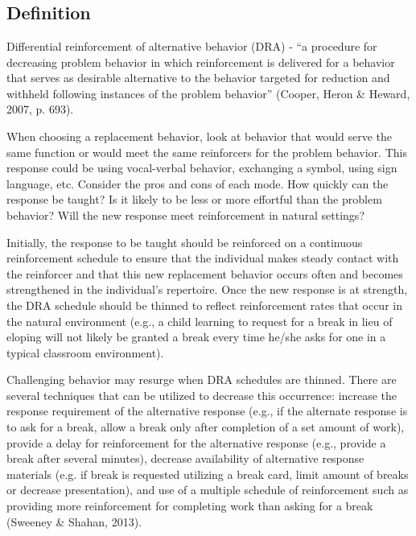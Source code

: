 \clearpage \section[\fourjTen{}]{\fourjTen{}%
              }
\subsection{Definition}
Differential reinforcement of alternative behavior (DRA) -  ``a procedure for decreasing problem behavior in which reinforcement is delivered for a behavior that serves as desirable alternative to the behavior targeted for reduction and withheld following instances of the problem behavior'' (Cooper, Heron \& Heward, 2007, p. 693).  

When choosing a replacement behavior, look at behavior that would serve the same function or would meet the same reinforcers for the problem behavior. This response could be using vocal-verbal behavior, exchanging a symbol, using sign language, etc. Consider the pros and cons of each mode. How quickly can the response be taught? Is it likely to be less or more effortful than the problem behavior? Will the new response meet reinforcement in natural settings?

Initially, the response to be taught should be reinforced on a continuous reinforcement schedule to ensure that the individual makes steady contact with the reinforcer and that this new replacement behavior occurs often and becomes strengthened in the individual's repertoire. Once the new response is at strength, the DRA schedule should be thinned to reflect reinforcement rates that occur in the natural environment (e.g., a child learning to request for a break in lieu of eloping will not likely be granted a break every time he/she asks for one in a typical classroom environment). 

Challenging behavior may resurge when DRA schedules are thinned. There are several techniques that can be utilized to decrease this occurrence: increase the response requirement of the alternative response (e.g., if the alternate response is to ask for a break, allow a break only after completion of a set amount of work), provide a delay for reinforcement for the alternative response (e.g., provide a break after several minutes), decrease availability of alternative response materials (e.g. if break is requested utilizing a break card, limit amount of breaks or decrease presentation), and use of a multiple schedule of reinforcement such as providing more reinforcement for completing work than asking for a break (Sweeney \& Shahan, 2013). 
%
